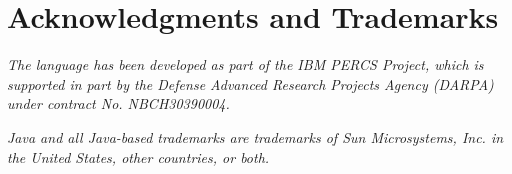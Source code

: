 \documentclass[10pt,twoside,notitlepage]{report}
\begin{document}
\clearpage
{}
\renewcommand{\bibname}{References}





\appendix





\chapter{Acknowledgments and Trademarks}

{\em The \Xten{} language has been developed as part of the IBM PERCS
Project, which is supported in part by the Defense Advanced Research
Projects Agency (DARPA) under contract No. NBCH30390004.}

{\em Java and all Java-based trademarks are trademarks of Sun Microsystems,
Inc. in the United States, other countries, or both.}
\end{document}
